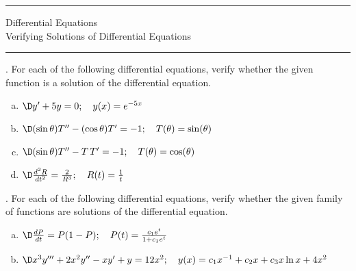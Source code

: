 \documentclass[12pt]{amsart}
\newcommand{\BACKROOT}{../../../..}
\newcommand{\TEACHINGROOT}{\BACKROOT}
\newcommand{\PATHTOHEADERS}{\TEACHINGROOT/Headers}
\numberwithin{equation}{section}
\begin{document}


\pagestyle{empty}

\noindent\rule{7.6in}{0.4pt}

{\centering\sc 
\noindent Differential Equations\\
 Verifying Solutions of Differential Equations \\
}
\noindent\rule{7.6in}{0.4pt}

\vspace{0.1cm}

. For each of the following differential equations, verify whether the given function is a solution of the differential equation. 

\begin{enumerate}[(a)]
\item  $\D y' + 5y = 0; \quad y(x)=e^{-5x}$ \\

\vfill

\item  $\D (\sin \theta)T'' - (\cos \theta)T' = -1; \quad T(\theta)=\sin(\theta)$\\

\vfill

\newpage
\thispagestyle{empty}

\item  $\D (\sin \theta)T'' - T\,T' = -1; \quad T(\theta)=\cos(\theta)$\\

\vfill

\item  $\D \frac{d^2R}{dt^2} = \frac{2}{R^3}; \quad R(t)=\frac{1}{t}$\\

\vfill

\end{enumerate}

\newpage
\thispagestyle{empty}

. For each of the following differential equations, verify whether the given family of functions are solutions of the differential equation. 
\begin{enumerate}[(a)]
\item  $\D \frac{dP}{dt}=P(1-P); \quad P(t)=\frac{c_1e^t}{1+c_1e^t}$ \\

\vfill

\item  $\D x^3y'''+2x^2y''-xy'+y=12x^2; \quad y(x)=c_1x^{-1}+c_2x+c_3x\ln x+4x^2$ \\

\vfill

\end{enumerate}
\end{document}
